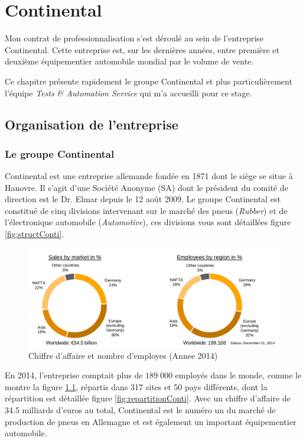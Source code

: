 \chapter{Continental}\label{chapConti}
\putminitoc
Mon contrat de professionnalisation s'est déroulé au sein de l'entreprise Continental. Cette entreprise est, sur les dernières années, entre première et deuxième équipementier automobile mondial par le volume de vente.

Ce chapitre présente rapidement le groupe Continental et plus particulièrement l'équipe \textit{Tests \& Automation Service} qui m'a accueilli pour ce stage.

\section{Organisation de l'entreprise}
\subsection{Le groupe Continental}
Continental est une entreprise allemande fondée en 1871 dont le siège se situe à Hanovre. Il s'agit d'une Société Anonyme (SA) dont le président du comité de
direction est le Dr. Elmar  depuis le 12 août 2009. Le groupe Continental est constitué de cinq divisions intervenant sur le marché des pneus (\textit{Rubber}) et de l'électronique automobile (\textit{Automotive}), ces divisions vous sont détaillées figure \ref{fig:structConti}.

\begin{figure}[H]
	\centering
	\includegraphics[width=17cm]{contents/images/caConti.png}
	\caption[Chiffre d'affaire et nombre d'employes (Annee 2014)]{Chiffre d'affaire et nombre d'employes (Annee 2014)\footnotemark{}}
	\label{fig:caConti}
\end{figure}
En 2014, l'entreprise comptait plus de $189\;000$ employés dans le monde, comme le montre la figure \ref{fig:caConti}, répartis dans 317 sites et 50 pays différents, dont la répartition est détaillée figure \ref{fig:repartitionConti}. Avec un chiffre d'affaire de 34.5 milliards d'euros au total, Continental est le numéro un du marché de production de pneus en Allemagne et est également un important équipementier automobile.

